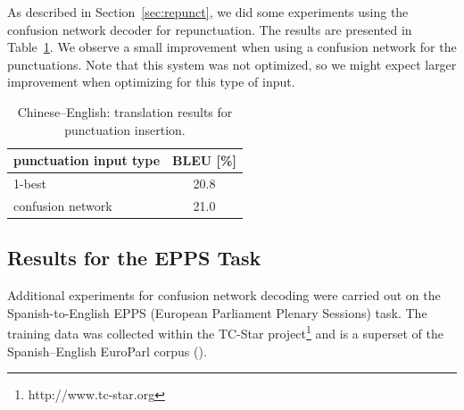 \documentclass[11pt]{report}
\theoremstyle{plain}
\begin{document}
{As described in Section~\ref{sec:repunct}, we did some experiments using the confusion network decoder for repunctuation.
The results are presented in Table~\ref{tab-ce-pm}.
We observe a small improvement when using a confusion network for the punctuations.
Note that this system was not optimized, so we might expect larger improvement when optimizing for this type of input.
\begin{table}[t]
\begin{center}
\caption{Chinese--English: translation results for punctuation insertion.} \label{tab-ce-pm}
\begin{tabular}{|l|c|}
\hline
punctuation input type & BLEU [\%]  \\ \hline
1-best & 20.8   \\  \hline
confusion network & 21.0  \\ 
\hline
\end{tabular}
\end{center}
\end{table}

	
\subsection{Results for the EPPS Task}
Additional experiments for confusion network decoding were carried out on the Spanish-to-English EPPS (European Parliament Plenary Sessions) task.
The training data was collected within the TC-Star project\footnote{http://www.tc-star.org} and is a superset of the Spanish--English EuroParl corpus (\cite{koehn:europarl:mtsummit:2005}).


}
\end{document}
